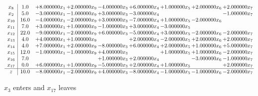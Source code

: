 \documentclass[10pt]{article}
\begin{document}
 \[\begin{array}{c| c c@{\hskip 2pt} c@{\hskip 2pt} c@{\hskip 2pt} c@{\hskip 2pt} c@{\hskip 2pt} c@{\hskip 2pt} c@{\hskip 2pt} }
 x_{8}   &  1.0 & + 8.000000 x_{1} & + 2.000000 x_{9} & -4.000000 x_{3} & + 6.000000 x_{4} & + 1.000000 x_{5} & + 2.000000 x_{6} & + 2.000000 x_{7}\\
 x_{2}   &  5.0 & -3.000000 x_{1} & -1.000000 x_{9} & + 3.000000 x_{3} & -3.000000 x_{4} &    &   & -1.000000 x_{7}\\
 x_{10}   &  16.0 & -4.000000 x_{1} & -2.000000 x_{9} & + 3.000000 x_{3} & -7.000000 x_{4} & + 1.000000 x_{5} & -2.000000 x_{6} &   \\
 x_{11}   &  7.0 & + 3.000000 x_{1} & + 1.000000 x_{9} & -1.000000 x_{3} & + 3.000000 x_{4} & -3.000000 x_{5} &    &   \\
 x_{12}   &  22.0 & -9.000000 x_{1} & -2.000000 x_{9} & + 6.000000 x_{3} & -5.000000 x_{4} & + 3.000000 x_{5} & -2.000000 x_{6} & -2.000000 x_{7}\\
 x_{13}   &  4.0 & + 4.000000 x_{1} & + 1.000000 x_{9} &   & + 2.000000 x_{4} & -2.000000 x_{5} & + 2.000000 x_{6} & + 2.000000 x_{7}\\
 x_{14}   &  4.0 & + 7.000000 x_{1} & + 2.000000 x_{9} & -8.000000 x_{3} & + 6.000000 x_{4} & + 2.000000 x_{5} & + 1.000000 x_{6} & + 5.000000 x_{7}\\
 x_{15}   &  12.0 & -1.000000 x_{1} & -1.000000 x_{9} & + 4.000000 x_{3} &   & + 1.000000 x_{5} & + 1.000000 x_{6} & -2.000000 x_{7}\\
 x_{16}   &  7.0  &    &   & + 1.000000 x_{3} & + 2.000000 x_{4} &   & -3.000000 x_{6} & -1.000000 x_{7}\\
 x_{17}   &  0.0 & + 6.000000 x_{1} & + 1.000000 x_{9} & -5.000000 x_{3} & + 2.000000 x_{4} & + 1.000000 x_{5} &   & + 2.000000 x_{7}\\
\hline
z    &  10.0 & -8.000000 x_{1} & -2.000000 x_{9} & + 4.000000 x_{3} & -8.000000 x_{4} & -1.000000 x_{5} & -1.000000 x_{6} & -2.000000 x_{7}\\
\end{array}\]


 $ x_{3} $ enters and $ x_{17} $ leaves 
\end{document}
